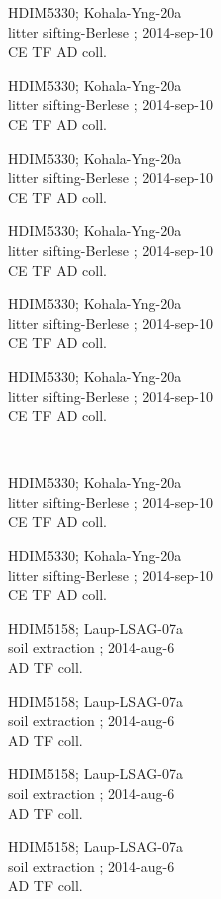 \documentclass[2pt]{extarticle}
\begin{document}
\noindent
\parbox{0.16\textwidth}{\tiny \raggedright \rule[-0.3\baselineskip]{0pt}{10pt}HDIM5330; Kohala-Yng-20a\\ litter sifting-Berlese  ; 2014-sep-10\\ CE TF AD coll.}
\parbox{0.16\textwidth}{\tiny \raggedright \rule[-0.3\baselineskip]{0pt}{10pt}HDIM5330; Kohala-Yng-20a\\ litter sifting-Berlese  ; 2014-sep-10\\ CE TF AD coll.}
\parbox{0.16\textwidth}{\tiny \raggedright \rule[-0.3\baselineskip]{0pt}{10pt}HDIM5330; Kohala-Yng-20a\\ litter sifting-Berlese  ; 2014-sep-10\\ CE TF AD coll.}
\parbox{0.16\textwidth}{\tiny \raggedright \rule[-0.3\baselineskip]{0pt}{10pt}HDIM5330; Kohala-Yng-20a\\ litter sifting-Berlese  ; 2014-sep-10\\ CE TF AD coll.}
\parbox{0.16\textwidth}{\tiny \raggedright \rule[-0.3\baselineskip]{0pt}{10pt}HDIM5330; Kohala-Yng-20a\\ litter sifting-Berlese  ; 2014-sep-10\\ CE TF AD coll.}
\parbox{0.16\textwidth}{\tiny \raggedright \rule[-0.3\baselineskip]{0pt}{10pt}HDIM5330; Kohala-Yng-20a\\ litter sifting-Berlese  ; 2014-sep-10\\ CE TF AD coll.} \\ 
\vspace{0.001in} 

\noindent
\parbox{0.16\textwidth}{\tiny \raggedright \rule[-0.3\baselineskip]{0pt}{10pt}HDIM5330; Kohala-Yng-20a\\ litter sifting-Berlese  ; 2014-sep-10\\ CE TF AD coll.}
\parbox{0.16\textwidth}{\tiny \raggedright \rule[-0.3\baselineskip]{0pt}{10pt}HDIM5330; Kohala-Yng-20a\\ litter sifting-Berlese  ; 2014-sep-10\\ CE TF AD coll.}
\parbox{0.16\textwidth}{\tiny \raggedright \rule[-0.3\baselineskip]{0pt}{10pt}HDIM5158; Laup-LSAG-07a\\ soil extraction  ; 2014-aug-6\\ AD TF coll.}
\parbox{0.16\textwidth}{\tiny \raggedright \rule[-0.3\baselineskip]{0pt}{10pt}HDIM5158; Laup-LSAG-07a\\ soil extraction  ; 2014-aug-6\\ AD TF coll.}
\parbox{0.16\textwidth}{\tiny \raggedright \rule[-0.3\baselineskip]{0pt}{10pt}HDIM5158; Laup-LSAG-07a\\ soil extraction  ; 2014-aug-6\\ AD TF coll.}
\parbox{0.16\textwidth}{\tiny \raggedright \rule[-0.3\baselineskip]{0pt}{10pt}HDIM5158; Laup-LSAG-07a\\ soil extraction  ; 2014-aug-6\\ AD TF coll.} \\ 
\vspace{0.001in} 
\end{document}
